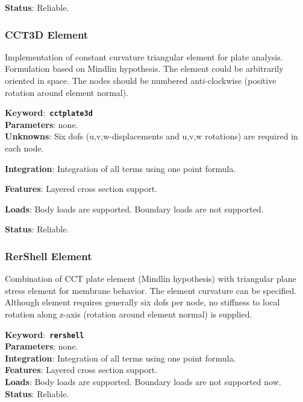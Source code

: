 \documentclass[a4paper]{article}
\newcommand{\descitem}[1]{{\noindent \bf #1}:}
\newcommand{\elemkeyword}[1]{\descitem{Keyword}~{\bf \texttt{#1}}}
\begin{document}
\descitem{Status} Reliable.

\subsubsection {CCT3D Element}
Implementation of constant curvature triangular element for plate
analysis. Formulation based on Mindlin hypothesis. The element could be arbitrarily oriented in space. 
The nodes should be numbered anti-clockwise (positive rotation around element normal). 


\elemkeyword{cctplate3d}\\
\descitem{Parameters} none.\\
\descitem{Unknowns}
Six dofs (u,v,w-displacements and u,v,w rotations) are required in each node.


\descitem{Integration}
Integration of all terms using one point formula.

\descitem{Features} Layered cross section support.

\descitem{Loads} Body loads are supported. Boundary loads are
not supported.

\descitem{Status} Reliable.

\subsubsection {RerShell Element}
Combination of CCT plate element (Mindlin hypothesis) with triangular plane stress element
for membrane behavior. The element curvature can be specified. 
Although element requires generally six dofs per node, no stiffness to
local rotation along z-axis (rotation around element normal) is supplied.

\elemkeyword{rershell}\\
\descitem{Parameters} none.\\
\descitem{Integration}
Integration of all terms using one point formula.\\
\descitem{Features} Layered cross section support.\\
\descitem{Loads} Body loads are supported. Boundary loads are
not supported now.\\
\descitem{Status} Reliable.
\end{document}
